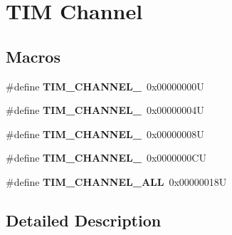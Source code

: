 \hypertarget{group___t_i_m___channel}{}\section{T\+IM Channel}
\label{group___t_i_m___channel}
\subsection*{Macros}
\begin{DoxyCompactItemize}
\item 
\mbox{\label{group___t_i_m___channel_ga6b1541e4a49d62610899e24bf23f4879}} 
\#define {\bfseries T\+I\+M\+\_\+\+C\+H\+A\+N\+N\+E\+L\+\_}~0x00000000U
\item 
\mbox{\label{group___t_i_m___channel_ga33e02d43345a7ac5886f01b39e4f7ccd}} 
\#define {\bfseries T\+I\+M\+\_\+\+C\+H\+A\+N\+N\+E\+L\+\_}~0x00000004U
\item 
\mbox{\label{group___t_i_m___channel_ga4ea100c1789b178f3cb46721b7257e2d}} 
\#define {\bfseries T\+I\+M\+\_\+\+C\+H\+A\+N\+N\+E\+L\+\_}~0x00000008U
\item 
\mbox{\label{group___t_i_m___channel_gad59ef74820ee8bf77fa1f8d589fde2ac}} 
\#define {\bfseries T\+I\+M\+\_\+\+C\+H\+A\+N\+N\+E\+L\+\_}~0x0000000\+CU
\item 
\mbox{\label{group___t_i_m___channel_ga6abf8f9fc695b79d8781ca082dfb48bc}} 
\#define {\bfseries T\+I\+M\+\_\+\+C\+H\+A\+N\+N\+E\+L\+\_\+\+A\+LL}~0x00000018U
\end{DoxyCompactItemize}


\subsection{Detailed Description}
